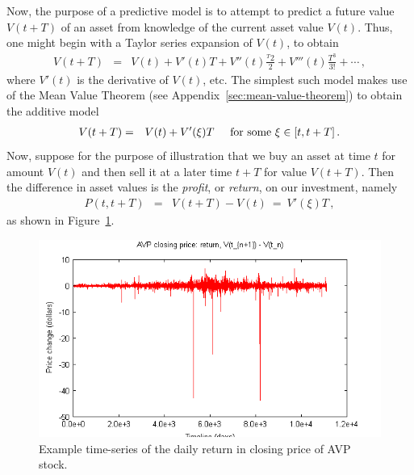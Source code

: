 \documentclass[a4paper]{book}
\begin{document}
Now, the purpose of a predictive model is to attempt to predict
a future value $V(t+T)$ of an asset
from knowledge of the current asset value
$V(t)$. Thus, one might begin with a Taylor series expansion
of $V(t)$, to obtain
\begin{eqnarray}
V(t+T) & = & V(t)+V'(t)T
+V''(t)\frac{^T2}{2}
+V'''(t)\frac{T^3}{3!}
+\cdots\,,
\label{eq:Taylor-V}
\end{eqnarray}
where $V'(t)$ is the derivative of $V(t)$, etc.
The simplest such model makes use of the Mean Value Theorem
(see Appendix~\ref{sec:mean-value-theorem}) to obtain
the additive model
\begin{eqnarray}
V(t+T) & = & V(t)+V'(\xi)T
\hspace*{5mm}\mbox{for some}\,\, \xi\in[t,t+T]\,.
\label{eq:simple-additive}
\end{eqnarray}
Now, suppose for the purpose of illustration that
we buy an asset at time $t$ for amount $V(t)$ and then sell it at a later
time $t+T$ for value $V(t+T)$. Then the difference in asset values is the
{\em profit}, or {\em return}, on our investment, namely
\begin{eqnarray}
  P(t,t+T) & = & V(t+T)-V(t)~=~V'(\xi)T\,,
\end{eqnarray}
as shown in Figure~\ref{fig:avp-price-diff}.
\begin{figure}[hbt]
\includegraphics[scale=0.8]{figures/avp-price-close-diff.png}
\caption{Example time-series of the daily return in closing price
of AVP stock.}
\label{fig:avp-price-diff}
\end{figure}
\end{document}
